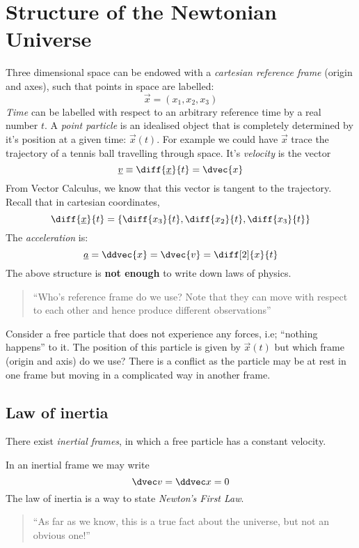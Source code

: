 \documentclass{article}
\numberwithin{equation}{section}
\begin{document}
\section{Structure of the Newtonian Universe}

Three dimensional space can be endowed with a \emph{cartesian reference frame} (origin and axes),
such that points in space are labelled:
\[\vec x = (x_1, x_2, x_3)\]
\emph{Time} can be labelled with respect to an arbitrary reference time by a real number $t$.
A \emph{point particle} is an idealised object that is completely determined by it's position at a given time: $\vec x(t)$.
For example we could have $\vec x$ trace the trajectory of a tennis ball travelling through space.
It's \emph{velocity} is the vector
\[\vec v \equiv \diff{\vec x}{t} = \dvec{x}\]
From Vector Calculus, we know that this vector is tangent to the trajectory. Recall that in cartesian coordinates, 
\[\diff{\vec x}{t} = \crbkt{\diff {x_3}{t}, \diff {x_2}{t}, \diff {x_3}{t}}\]
The \emph{acceleration} is:
\[\vec a = \ddvec{x} = \dvec{v} = \diff[2]{x}{t}\]
The above structure is \textbf{not enough} to write down laws of physics.

\begin{quote}
    ``Who's reference frame do we use? Note that they can move with respect to each other and hence produce different observations''
\end{quote}

Consider a free particle that does not experience any forces, i.e; ``nothing happens'' to it.
The position of this particle is given by $\vec x(t)$ but which frame (origin and axis) do we use?
There is a conflict as the particle may be at rest in one frame but moving in a complicated way in another frame.

\subsection{Law of inertia}
There exist \emph{inertial frames}, in which a free particle has a constant velocity.

In an inertial frame we may write
\[\dvec v = \ddvec x = 0\]
The law of inertia is a way to state \emph{Newton's First Law}.

\begin{quote}
    ``As far as we know, this is a true fact about the universe, but not an obvious one!''
\end{quote}
\end{document}
